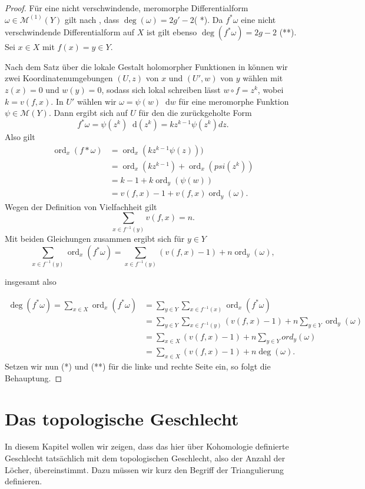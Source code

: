 \documentclass[11pt,a4paper,toc=bibliography]{scrartcl}
\theoremstyle{thm}
\theoremstyle{def}
\theoremstyle{remark}
\DeclareMathOperator{\ord}{ord}
\newcommand*\dif{\mathop{}\!\mathrm{d}}\newcommand{\einschraenkung}{\,\rule[-5pt]{0.4pt}{12pt}\,{}} %
\begin{document}
\begin{proof}
Für eine nicht verschwindende, meromorphe Differentialform $\omega\in \mathcal{M}^{(1)}(Y)$ gilt nach , dass
 $\deg(\omega)=2g'-2$( *). Da $f^*\omega$ eine nicht verschwindende Differentialform auf $X$ ist gilt ebenso $\deg (f^*\omega)=2g-2$ (**). Sei $x\in X$ mit $f(x)=y\in Y$. 
 
 Nach dem Satz über die lokale Gestalt holomorpher Funktionen in \cite[~S.9]{forster} können wir zwei Koordinatenumgebungen $(U,z)$ von $x$ und $(U',w)$ von $y$ wählen mit $z(x)=0$ und $w(y)=0$, sodass sich lokal schreiben lässt $w\circ f=z^k$, wobei $k=v(f,x)$. In $U'$ wählen wir $\omega = \psi (w) \dif w$ für eine meromorphe Funktion $\psi\in \mathcal{M}(Y)$. Dann ergibt sich auf $U$ für den die zurückgeholte Form 
\[
f^*\omega = \psi(z^k)\dif (z^k) = kz^{k-1}\psi(z^k)dz.
\]    	
Also gilt 
\begin{align*}
	{\ord_x} (f*\omega) 	&= \ord_x(kz^{k-1}\psi(z)))\\
					  	&= \ord_x(kz^{k-1})+\ord_x(psi(z^k))\\
					  	&= k-1 +k\ord_y(\psi(w))\\
					  	&= v(f,x)-1+v(f,x) \ord_y(\omega).
\end{align*}
Wegen der Definition von Vielfachheit gilt 
\[
\sum_{x\in f^{-1}(y)} v(f,x) = n.
\]
Mit beiden Gleichungen zusammen ergibt sich für $y\in Y$ 
\[
\sum_{x\in f^{-1}(y)} \ord_x(f^*\omega)= \sum_{x\in f^{-1}(y)}\left( v(f,x)-1 \right) +n \ord_y(\omega),
\]

insgesamt also

\begin{align*}
	\deg(f^*\omega)=\sum_{x\in X} \textstyle{\ord_x}(f^*\omega) &= \sum_{y\in Y}\sum_{x\in f^{-1}(x)} \textstyle{\ord_x}(f^*\omega)\\
	&=\sum_{y\in Y}\sum_{x\in f^{-1}(y)}(v(f,x)-1)+ n\sum_{y\in Y}\textstyle{\ord_y}(\omega) \\
	&=\sum_{x\in X} (v(f,x)-1) + n\sum_{y\in Y} {ord_y}(\omega)\\
	&=\sum_{x\in X} (v(f,x)-1) + n\deg (\omega).
	\end{align*}
	Setzen wir nun (*) und (**) für die linke und rechte Seite ein, so folgt die Behauptung. 
\end{proof}

\section{Das topologische Geschlecht}
In diesem Kapitel wollen wir zeigen, dass das hier über Kohomologie definierte Geschlecht tatsächlich mit dem topologischen Geschlecht, also der Anzahl der Löcher, übereinstimmt.
Dazu müssen wir kurz den Begriff der Triangulierung definieren.
\end{document}
